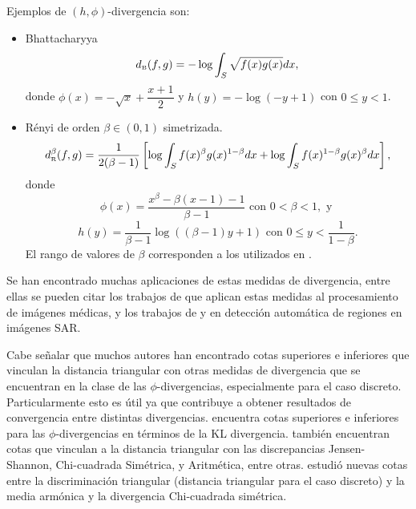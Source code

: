 \begin{example} Ejemplos de $(h,\phi)$-divergencia son:
	\begin{itemize}
		\item Bhattacharyya 
		\begin{align}
		\label{Bhattacharyya}
		d_{\text{\tiny{B}}}(f,g)=-\log \displaystyle \int_{S} \sqrt{f(x) g(x)} dx,
		\end{align}
		donde $\phi(x)=-\sqrt{x}+\dfrac{x+1}{2}$ y $h(y)=-\log(-y+1)$ con $0\leq y<1$.
		\item R\'enyi de orden $\beta\in(0,1)$ simetrizada.
		\begin{align}
		d_\text{\tiny{R}}^{\beta}(f,g)=\frac{1}{2(\beta-1)}\left[\log\int_{S}{f(x)^{\beta}g(x)^{1-\beta} dx+\log\int_{S}f(x)^{1-\beta}g(x)^{\beta}} dx\right],
		\end{align}
		donde 
		$$\phi(x)=\dfrac{x^{\beta}-\beta(x-1)-1}{\beta-1} \text{ con } 0 < \beta < 1, \text{ y }$$  
		$$h(y)=\dfrac{1}{\beta-1}\log((\beta-1)y+1) \text{ con } 0\leq y<\dfrac{1}{1-\beta}.$$
		El rango de valores de $\beta$ corresponden a los utilizados en \citet{Venkatesan2019,Nascimento2009}.
	\end{itemize}
\end{example}

Se han encontrado muchas aplicaciones de estas medidas de divergencia, entre ellas se pueden citar los trabajos de \citet{Aviyente2007} que aplican estas medidas al procesamiento de imágenes médicas, y los trabajos de \citet{ClassificationPolSARSegmentsMinimizationWishartDistances} y \citet{EdgeDetectionDistancesEntropiesJSTARS} en detección automática de regiones en imágenes SAR. 

Cabe señalar que muchos autores han encontrado cotas superiores e inferiores que vinculan la distancia triangular con otras medidas de divergencia que se encuentran en la clase de las $\phi$-divergencias, especialmente para el caso discreto. Particularmente esto es útil ya que contribuye a obtener resultados de convergencia entre distintas divergencias. \citet{Dragomir2002} encuentra cotas superiores e inferiores para las $\phi$-divergencias en términos de la KL divergencia. \citet{JainSrivastava2007} también encuentran cotas que vinculan a la distancia triangular con las discrepancias Jensen-Shannon, Chi-cuadrada Simétrica, y Aritmética, entre otras. 
\citet{Taneja2006} estudió nuevas cotas entre la discriminación triangular (distancia triangular para el caso discreto) y la media armónica y la  divergencia Chi-cuadrada simétrica.

